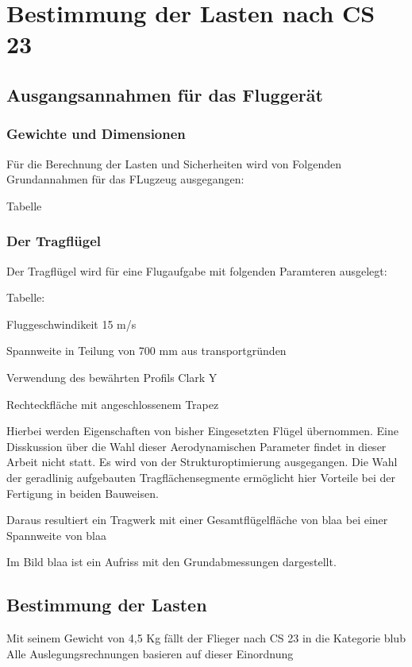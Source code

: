 \chapter{Bestimmung der Lasten nach CS 23}\label{cha:Bestimmung der Lasten nach CS 23}

\section{Ausgangsannahmen für das Fluggerät}

\subsection{Gewichte und Dimensionen}

Für die Berechnung der Lasten und Sicherheiten wird von Folgenden Grundannahmen für das FLugzeug ausgegangen:

Tabelle

\subsection{Der Tragflügel}

Der Tragflügel wird für eine Flugaufgabe mit folgenden Paramteren ausgelegt:

Tabelle:

Fluggeschwindikeit 15 m/s

Spannweite in Teilung von 700 mm aus transportgründen

Verwendung des bewährten Profils Clark Y

Rechteckfläche mit angeschlossenem Trapez

Hierbei werden Eigenschaften von bisher Eingesetzten Flügel übernommen.
Eine Disskussion über die Wahl dieser Aerodynamischen Parameter findet in dieser Arbeit nicht statt. 
Es wird von der Strukturoptimierung ausgegangen.
Die Wahl der geradlinig aufgebauten Tragflächensegmente ermöglicht hier Vorteile bei der Fertigung in beiden Bauweisen.


Daraus resultiert ein Tragwerk mit einer Gesamtflügelfläche von blaa bei einer Spannweite von blaa

Im Bild blaa ist ein Aufriss mit den Grundabmessungen dargestellt.

\section{Bestimmung der Lasten}

Mit seinem Gewicht von 4,5 Kg fällt der Flieger nach CS 23 in die Kategorie blub
Alle Auslegungsrechnungen basieren auf dieser Einordnung

